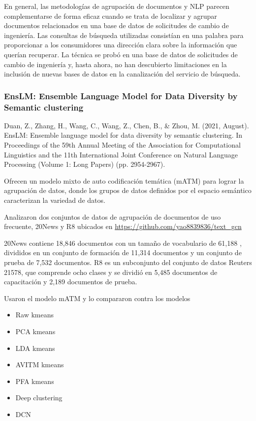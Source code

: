 \documentclass[12pt]{article}
\begin{document}
			En general, las metodologías de agrupación de documentos y NLP parecen complementarse de forma eficaz cuando se trata de localizar y agrupar documentos relacionados en una base de datos de solicitudes de cambio de ingeniería. Las consultas de búsqueda utilizadas consistían en una palabra para proporcionar a los consumidores una dirección clara sobre la información que querían recuperar. La técnica se probó en una base de datos de solicitudes de cambio de ingeniería y, hasta ahora, no han descubierto limitaciones en la inclusión de nuevas bases de datos en la canalización del servicio de búsqueda.
			
			\subsubsection{EnsLM: Ensemble Language Model for Data Diversity 		by Semantic clustering}
			Duan, Z., Zhang, H., Wang, C., Wang, Z., Chen, B., \& Zhou, M. (2021, August). EnsLM: Ensemble language model for data diversity by semantic clustering. In Proceedings of the 59th Annual Meeting of the Association for Computational Linguistics and the 11th International Joint Conference on Natural Language Processing (Volume 1: Long Papers) (pp. 2954-2967).
			
			
			Ofrecen un modelo mixto de auto codificación temática (mATM) para lograr la agrupación de datos, donde los grupos de datos definidos por el espacio semántico caracterizan la variedad de datos.
			
			Analizaron dos conjuntos de datos de agrupación de documentos de uso frecuente, 20News y R8 \cite{Yao2019} ubicados en \url{https://github.com/yao8839836/text_gcn}
			
			20News contiene 18,846 documentos con un tamaño de vocabulario de 61,188 , divididos en un conjunto de formación de 11,314 documentos y un conjunto de prueba de 7,532 documentos. R8 es un subconjunto del conjunto de datos Reuters 21578, que comprende ocho clases y se dividió en 5,485 documentos de capacitación y 2,189 documentos de prueba.
			
			Usaron el modelo mATM y lo compararon contra los modelos
			
			\begin{itemize}
				\item Raw kmeans
				
				\item PCA kmeans
				
				\item LDA kmeans
				
				\item AVITM kmeans
				
				\item PFA kmeans
				
				\item Deep clustering 
				
				\item DCN
			\end{itemize}
			
\end{document}

